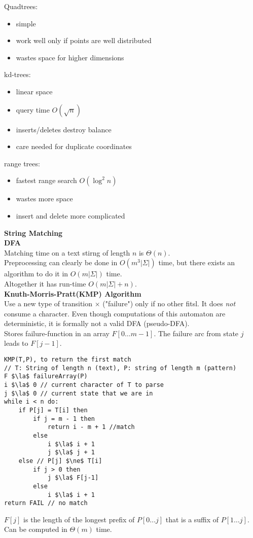 \documentclass[12pt]{article}
\newcommand{\la}{\leftarrow}
\begin{document}
{Quadtrees:
\begin{itemize}
	\renewcommand\labelitemi{--}
	\item simple
	\item work well only if points are well distributed
	\item wastes space for higher dimensions
\end{itemize}
kd-trees:
\begin{itemize}
	\renewcommand\labelitemi{--}
	\item linear space
	\item query time $O(\sqrt{n})$
	\item inserts/deletes destroy balance
	\item care needed for duplicate coordinates
\end{itemize}
range trees:
\begin{itemize}
	\renewcommand\labelitemi{--}
	\item fastest range search $O(\log^2 n)$
	\item wastes more space
	\item insert and delete more complicated
\end{itemize}

{\Large\bf String Matching}\\

\textbf{DFA}\\

Matching time on a text stirng of length $n$ is $\Theta(n)$.\\
Preprocessing can clearly be done in $O(m^3|\Sigma|)$ time, but there exists an algorithm to do it in $O(m|\Sigma|)$ time.\\
Altogether it has run-time $O(m|\Sigma|+n)$. \\

\textbf{Knuth-Morris-Pratt(KMP) Algorithm}\\
Use a new type of transition $\times$ ("failure") only if no other fitsl. It does \emph{not} consume a character. Even though computations of this automaton are deterministic, it is formally not a valid DFA (pseudo-DFA).\\
Stores failure-function in an array $F[0\dots m-1]$. The failure arc from state $j$ leads to $F[j-1]$. 
\begin{lstlisting}[mathescape=true]
KMP(T,P), to return the first match
// T: String of length n (text), P: string of length m (pattern)
F $\la$ failureArray(P)
i $\la$ 0 // current character of T to parse
j $\la$ 0 // current state that we are in 
while i < n do:
	if P[j] = T[i] then
		if j = m - 1 then
			return i - m + 1 //match
		else
			i $\la$ i + 1
			j $\la$ j + 1
	else // P[j] $\ne$ T[i]
		if j > 0 then
			j $\la$ F[j-1]
		else
			i $\la$ i + 1
return FAIL // no match
\end{lstlisting}
$F[j]$ is the length of the longest prefix of $P[0\dots j]$ that is a suffix of $P[1\dots j]$. Can be computed in $\Theta(m)$ time. \\

}
\end{document}
